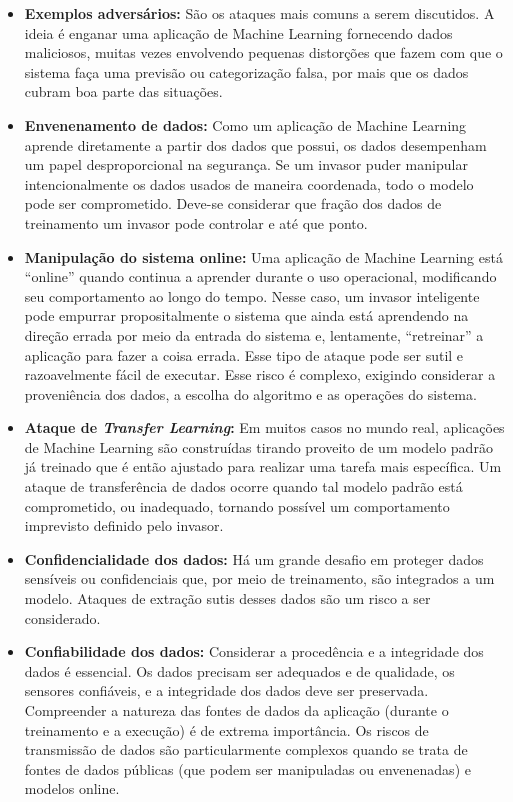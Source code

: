 \documentclass[portugues, 12pt, a4paper]{article}
\begin{document}
\begin{itemize}
\item \textbf{Exemplos adversários:} São os ataques mais comuns a serem discutidos. A ideia é enganar uma aplicação de Machine Learning fornecendo dados maliciosos, muitas vezes envolvendo pequenas distorções que fazem com que o sistema faça uma previsão ou categorização falsa, por mais que os dados cubram boa parte das situações.

\item \textbf{Envenenamento de dados:} Como um aplicação de Machine Learning aprende diretamente a partir dos dados que possui, os dados desempenham um papel desproporcional na segurança. Se um invasor puder manipular intencionalmente os dados usados de maneira coordenada, todo o modelo pode ser comprometido. Deve-se considerar que fração dos dados de treinamento um invasor pode controlar e até que ponto.

\item \textbf{Manipulação do sistema online:} Uma aplicação de Machine Learning está “online” quando continua a aprender durante o uso operacional, modificando seu comportamento ao longo do tempo. Nesse caso, um invasor inteligente pode empurrar propositalmente o sistema que ainda está aprendendo na direção errada por meio da entrada do sistema e, lentamente, “retreinar” a aplicação para fazer a coisa errada. Esse tipo de ataque pode ser sutil e razoavelmente fácil de executar. Esse risco é complexo, exigindo considerar a proveniência dos dados, a escolha do algoritmo e as operações do sistema.

\item \textbf{Ataque de \textit{Transfer Learning}:} Em muitos casos no mundo real, aplicações de Machine Learning são construídas tirando proveito de um modelo padrão já treinado que é então ajustado para realizar uma tarefa mais específica. Um ataque de transferência de dados ocorre quando tal modelo padrão está comprometido, ou inadequado, tornando possível um comportamento imprevisto definido pelo invasor.

\item \textbf{Confidencialidade dos dados:} Há um grande desafio em proteger dados sensíveis ou confidenciais que, por meio de treinamento, são integrados a um modelo. Ataques de extração sutis desses dados são um risco a ser considerado.

\item \textbf{Confiabilidade dos dados:} Considerar a procedência e a integridade dos dados é essencial. Os dados precisam ser adequados e de qualidade, os sensores confiáveis, e a integridade dos dados deve ser preservada. Compreender a natureza das fontes de dados da aplicação (durante o treinamento e a execução) é de extrema importância. Os riscos de transmissão de dados são particularmente complexos quando se trata de fontes de dados públicas (que podem ser manipuladas ou envenenadas) e modelos online.


\end{itemize}
\end{document}
